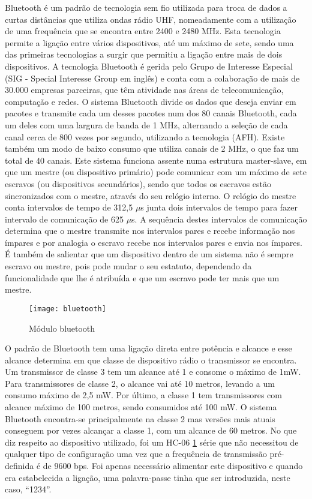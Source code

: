 Bluetooth é um padrão de tecnologia sem fio utilizada para troca de dados a curtas distâncias que utiliza ondas rádio UHF, nomeadamente com a utilização de uma frequência que se encontra entre 2400 e 2480 MHz.
Esta tecnologia permite a ligação entre vários dispositivos, até um máximo de sete, sendo uma das primeiras tecnologias a surgir que permitiu a ligação entre mais de dois dispositivos.
A tecnologia Bluetooth é gerida pelo Grupo de Interesse Especial (SIG - Special Interesse Group em inglês) e conta com a colaboração de mais de 30.000 empresas parceiras, que têm atividade nas áreas de telecomunicação, computação e redes.
O sistema Bluetooth divide os dados que deseja enviar em pacotes e transmite cada um desses pacotes num dos 80 canais Bluetooth, cada um deles com uma largura de banda de 1 MHz, alternando a seleção de cada canal cerca de 800 vezes por segundo, utilizando a tecnologia (AFH).
Existe também um modo de baixo consumo que utiliza canais de 2 MHz, o que faz um total de 40 canais.
Este sistema funciona assente numa estrutura master-slave, em que um mestre (ou dispositivo primário) pode comunicar com um máximo de sete escravos (ou dispositivos secundários), sendo que todos os escravos estão sincronizados com o mestre, através do seu relógio interno.
O relógio do mestre conta intervalos de tempo de 312,5 $\mu$s junta dois intervalos de tempo para fazer intervalo de comunicação de 625 $\mu$s.
A sequência destes intervalos de comunicação determina que o mestre transmite nos intervalos pares e recebe informação nos ímpares e por analogia o escravo recebe nos intervalos pares e envia nos ímpares.
É também de salientar que um dispositivo dentro de um sistema não é sempre escravo ou mestre, pois pode mudar o seu estatuto, dependendo da funcionalidade que lhe é atribuída e que um escravo pode ter mais que um mestre.

\begin{figure}[hbtp]
	\centering
	\texttt{[image: bluetooth]}
	\caption[Módulo bluetooth]{Módulo bluetooth \footnotemark}
	\label{fig:modulo_bluetooth}
\end{figure}

O padrão de Bluetooth tem uma ligação direta entre potência e alcance e esse alcance determina em que classe de dispositivo rádio o transmissor se encontra.
Um transmissor de classe 3 tem um alcance até 1 e consome o máximo de 1mW.
Para transmissores de classe 2, o alcance vai até 10 metros, levando a um consumo máximo de 2,5 mW.
Por último, a classe 1 tem transmissores com alcance máximo de 100 metros, sendo consumidos até 100 mW.
O sistema Bluetooth encontra-se principalmente na classe 2 mas versões mais atuais conseguem por vezes alcançar a classe 1, com um alcance de 60 metros.
No que diz respeito ao dispositivo utilizado, foi um HC-06 \ref{fig:modulo_bluetooth} série que não necessitou de qualquer tipo de configuração uma vez que a frequência de transmissão pré-definida é de 9600 bps.
Foi apenas necessário alimentar este dispositivo e quando era estabelecida a ligação, uma palavra-passe tinha que ser introduzida, neste caso, ``1234''.

